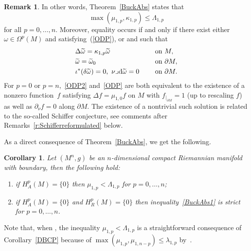 \documentclass[10pt,a4paper]{amsart}
\numberwithin{equation}{section}
\newtheorem{Corollary}[Theorem]{Corollary}
\theoremstyle{definition}
\newtheorem{Remark}[Theorem]{Remark}
\begin{document}
\begin{Remark}
In other words, Theorem~\ref{BuckAbs} states that
\[%
\max (\mu_{1,p},\kappa_{1,p} )\leq\Lambda_{1,p}
\]
for all $p=0,\dots,n$. Moreover, equality occurs if and only if there exist either $\omega\in\Omega^p(M)$ and  satisfying~(\ref{ODP}), or  and  such that
\begin{equation}\label{ODP2}
\begin{aligned}
&\Delta \widetilde{\omega} =\kappa_{1,p} \widetilde{\omega} \ \quad &&\textrm{on } M, \\
&\widetilde{\omega} = \widetilde{\omega}_0 \ \quad && \textrm{on }\partial M, \\
&\iota^*(\delta\widetilde{\omega}) =0,\ \nu\lrcorner {\rm d}\widetilde{\omega} =0\ \quad && \textrm{on }\partial M.
\end{aligned}
\end{equation}
For $p=0$ or $p=n$,~\eqref{ODP2}
and~\eqref{ODP} are both equivalent to the existence of a nonzero function~$f$ satisfying $\Delta f=\mu_{1,0}f$ on $M$ with $f_{|_{\partial M}}=1$ (up to rescaling $f$) as well as $\partial_\nu f=0$ along $\partial M$.
The existence of a nontrivial such solution is related to the so-called Schiffer conjecture, see comments after Remarks~\ref{r:Schifferreformulated} below.
\end{Remark}

As a direct consequence of Theorem~\ref{BuckAbs}, we get the following.
\begin{Corollary}
Let $(M^n,g)$ be an $n$-dimensional compact Riemannian manifold with boundary, then the following hold:
\begin{enumerate}\itemsep=0pt\samepage
\item[$(1)$] if $H^p_A(M)=\{0\}$ then $\mu_{1,p}<\Lambda_{1,p}$ for $p=0,\dots,n$;
\item[$(2)$] if $H^p_A(M)=\{0\}$ and $H^p_R(M)=\{0\}$ then inequality~\eqref{BuckAbs1} is strict for $p=0,\dots,n$.
\end{enumerate}
\end{Corollary}

Note that, when , the inequality $\mu_{1,p}<\Lambda_{1,p}$ is a straightforward consequence of Corollary~\ref{DBCP} because of $\max(\mu_{1,p},\mu_{1,n-p})\leq \lambda_{1,p}$ by~\cite[Proposition~5.4]{elchamiginouxhabib19}.
\end{document}
